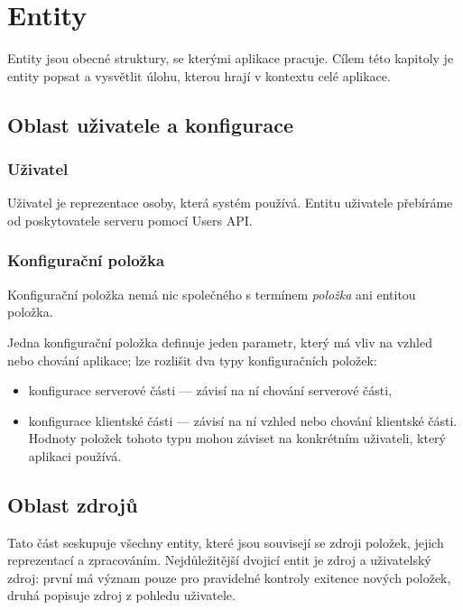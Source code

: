 \section{Entity}

Entity jsou obecné struktury, se kterými aplikace pracuje.
Cílem této kapitoly je entity popsat a vysvětlit úlohu, kterou hrají v kontextu celé aplikace.

\subsection{Oblast uživatele a konfigurace}

\subsubsection{Uživatel}

Uživatel je reprezentace osoby, která systém používá.
Entitu uživatele přebíráme od poskytovatele serveru pomocí Users API.

\subsubsection{Konfigurační položka}

Konfigurační položka nemá nic společného s termínem \textit{položka} ani entitou položka.

Jedna konfigurační položka definuje jeden parametr, který má vliv na vzhled nebo chování aplikace; lze rozlišit dva typy konfiguračních položek:
\begin{itemize}
	\item konfigurace serverové části --- závisí na ní chování serverové části,
	\item konfigurace klientské části --- závisí na ní vzhled nebo chování klientské části.
		Hodnoty položek tohoto typu mohou záviset na konkrétním uživateli, který aplikaci používá.
\end{itemize}

\subsection{Oblast zdrojů}

Tato část seskupuje všechny entity, které jsou souvisejí se zdroji položek, jejich reprezentací a zpracováním.
Nejdůležitější dvojicí entit je zdroj a uživatelský zdroj: první má význam pouze pro pravidelné kontroly exitence nových položek, druhá popisuje zdroj z pohledu uživatele.

